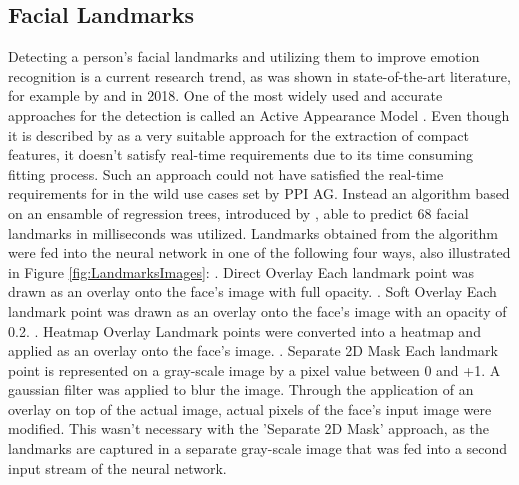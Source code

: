 \subsection{Facial Landmarks}
Detecting a person's facial landmarks and utilizing them to improve emotion recognition is a current research trend, as was shown in state-of-the-art literature, for example by \citet{Gupta:2018:FacialLandmarks-1} and \citet{Tautkute:2018:FacialLandmarks-2} in 2018. One of the most widely used and accurate approaches for the detection is called an Active Appearance Model \citep{Cootes:2001:ActiveAppearanceModel}. Even though it is described by \citet{Gao:2010:ActiveAppearanceModels} as a very suitable approach for the extraction of compact features, it doesn't satisfy real-time requirements due to its time consuming fitting process.
\newline\newline
Such an approach could not have satisfied the real-time requirements for in the wild use cases set by PPI AG. Instead an algorithm based on an ensamble of regression trees, introduced by \citet{Kazemi:2014:ShapePredictor}, able to predict 68 facial landmarks in milliseconds was utilized.
\newline\newline
Landmarks obtained from the algorithm were fed into the neural network in one of the following four ways, also illustrated in Figure \ref{fig:LandmarksImages}: 
\newline{}. Direct Overlay\newline
Each landmark point was drawn as an overlay onto the face's image with full opacity.
\newline{}. Soft Overlay\newline
Each landmark point was drawn as an overlay onto the face's image with an opacity of 0.2.
\newline{}. Heatmap Overlay\newline
Landmark points were converted into a heatmap and applied as an overlay onto the face's image.
\newline{}. Separate 2D Mask\newline
Each landmark point is represented on a gray-scale image by a pixel value between 0 and +1. A gaussian filter was applied to blur the image.
\newline\newline
Through the application of an overlay on top of the actual image, actual pixels of the face's input image were modified. This wasn't necessary with the 'Separate 2D Mask' approach, as the landmarks are captured in a separate gray-scale image that was fed into a second input stream of the neural network.

